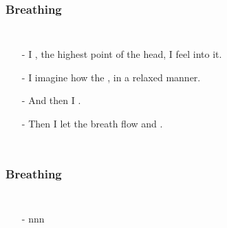 \begin{frame}
\frametitle{Breathing}
\begin{columns}[c] %

\begin{itemize}
\item[-] I , the highest point of the head, I feel into it.
\item[-] I imagine how the , in a relaxed manner.
\item[-] And then I .
\item[-] Then I let the breath flow  and .
\end{itemize}
\end{columns}
\end{frame}

\begin{frame}
\frametitle{Breathing}
\begin{columns}[c] %

\begin{itemize}
\item[-] nnn

  \end{itemize}
\end{columns}
\end{frame}

